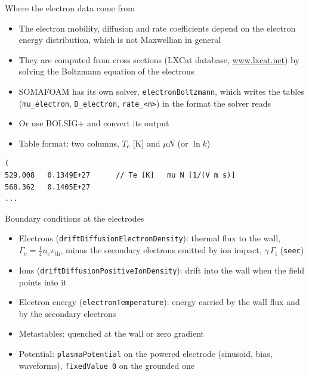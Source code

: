 \documentclass[aspectratio=169,11pt]{beamer}
\newcommand{\kw}[1]{\texttt{#1}}
\newcommand{\Te}{T_\mathrm{e}}
\newcommand{\nel}{n_\mathrm{e}}
\begin{document}
\begin{frame}[fragile]{Where the electron data come from}
  \begin{itemize}
    \item The electron mobility, diffusion and rate coefficients depend on the electron
          energy distribution, which is not Maxwellian in general
    \item They are computed from cross sections (LXCat database, \url{www.lxcat.net}) by
          solving the Boltzmann equation of the electrons
    \item SOMAFOAM has its own solver, \kw{electronBoltzmann}, which writes the tables
          (\kw{mu\_electron}, \kw{D\_electron}, \kw{rate\_<n>}) in the format the solver reads
    \item Or use BOLSIG+ and convert its output
    \item Table format: two columns, $\Te$ [K] and $\mu N$ (or $\ln k$)
  \end{itemize}
  \begin{lstlisting}
(
529.008   0.1349E+27      // Te [K]   mu N [1/(V m s)]
568.362   0.1405E+27
...
  \end{lstlisting}
\end{frame}

\begin{frame}{Boundary conditions at the electrodes}
  \begin{itemize}
    \item Electrons (\kw{driftDiffusionElectronDensity}): thermal flux to the wall,
          $\Gamma_\mathrm{e}=\tfrac14\nel v_\mathrm{th}$, minus the secondary electrons
          emitted by ion impact, $\gamma\,\Gamma_\mathrm{i}$ (\kw{seec})
    \item Ions (\kw{driftDiffusionPositiveIonDensity}): drift into the wall when the field
          points into it
    \item Electron energy (\kw{electronTemperature}): energy carried by the wall flux and by the secondary electrons
    \item Metastables: quenched at the wall or zero gradient
    \item Potential: \kw{plasmaPotential} on the powered electrode (sinusoid, bias,
          waveforms), \kw{fixedValue 0} on the grounded one
  \end{itemize}
\end{frame}
\end{document}
